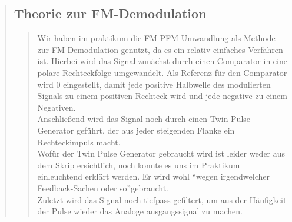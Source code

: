\begin{quote}
    \subsection{Theorie zur FM-Demodulation}
    \begin{quote}
        Wir haben im praktikum die FM-PFM-Umwandlung als Methode zur FM-Demodulation genutzt, da es ein relativ einfaches
        Verfahren ist. Hierbei wird das Signal zunächst durch einen Comparator in eine polare Rechteckfolge umgewandelt. Als
        Referenz für den Comparator wird \si{0}{\volt} eingestellt, damit jede positive Halbwelle des modulierten Signals zu
        einem positiven Rechteck wird und jede negative zu einem Negativen.\\
        Anschließend wird das Signal noch durch einen Twin Pulse Generator geführt, der aus jeder steigenden Flanke ein
        Rechteckimpuls macht.\\
        Wofür der Twin Pulse Generator gebraucht wird ist leider weder aus dem Skrip ersichtlich, noch konnte es uns im Praktikum
        einleuchtend erklärt werden. Er wird wohl ``wegen irgendwelcher Feedback-Sachen oder so''\footnotemark gebraucht.\\
        Zuletzt wird das Signal noch tiefpass-gefiltert, um aus der Häufigkeit der Pulse wieder das Analoge ausgangssignal zu
        machen.
        
    \end{quote}
    
    
\end{quote}



